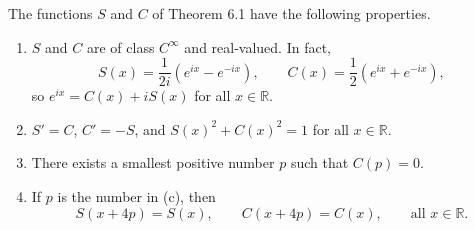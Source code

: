 The functions $S$ and $C$ of Theorem 6.1 have the following properties.

\begin{enumerate}
\item[(a)] $S$ and $C$ are of class $C^\infty$ and real-valued. In fact,
  $$
  S(x) = \frac{1}{2i}(e^{ix} - e^{-ix}), \qquad
  C(x) = \frac{1}{2}(e^{ix} + e^{-ix}),
  $$
  so $e^{ix} = C(x) + iS(x)$ for all $x \in \mathbb{R}$.

\item[(b)] $S' = C$, $C' = -S$, and $S(x)^2 + C(x)^2 = 1$ for all $x \in \mathbb{R}$.

\item[(c)] There exists a smallest positive number $p$ such that $C(p) = 0$.

\item[(d)] If $p$ is the number in (c), then
  $$S(x + 4p) = S(x), \qquad C(x + 4p) = C(x), \qquad \text{all } x \in \mathbb{R}.$$
\end{enumerate}
